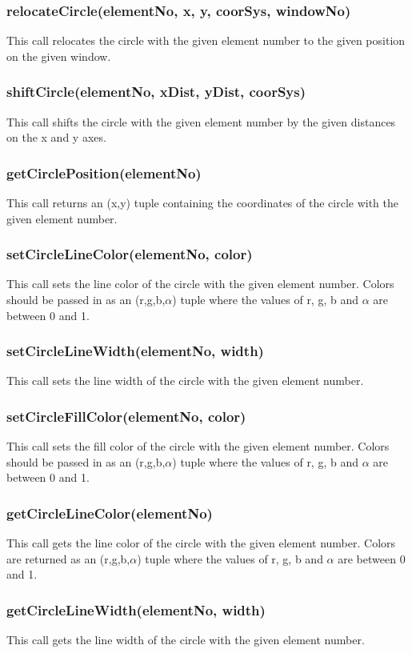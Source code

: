 \documentclass{acm_proc_article-sp}
\begin{document}
\subsubsection{relocateCircle(elementNo, x, y, coorSys, windowNo)}
This call relocates the circle with the given element number to the given position on the given window.
\subsubsection{shiftCircle(elementNo, xDist, yDist, coorSys)}
This call shifts the circle with the given element number by the given distances on the x and y axes.
\subsubsection{getCirclePosition(elementNo)}
This call returns an (x,y) tuple containing the coordinates of the circle with the given element number.
\subsubsection{setCircleLineColor(elementNo, color)}
This call sets the line color of the circle with the given element number. Colors should be passed in as an (r,g,b,$\alpha$) tuple where the values of r, g, b and $\alpha$ are between 0 and 1.
\subsubsection{setCircleLineWidth(elementNo, width)}
This call sets the line width of the circle with the given element number.
\subsubsection{setCircleFillColor(elementNo, color)}
This call sets the fill color of the circle with the given element number. Colors should be passed in as an (r,g,b,$\alpha$) tuple where the values of r, g, b and $\alpha$ are between 0 and 1.
\subsubsection{getCircleLineColor(elementNo)}
This call gets the line color of the circle with the given element number. Colors are returned as an (r,g,b,$\alpha$) tuple where the values of r, g, b and $\alpha$ are between 0 and 1.
\subsubsection{getCircleLineWidth(elementNo, width)}
This call gets the line width of the circle with the given element number.
\end{document}
